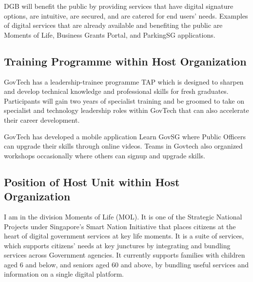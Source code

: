 \noindent
DGB will benefit the public by providing services that have digital signature options, are intuitive, are secured, and are catered for end users' needs. Examples of digital services that are already available and benefiting the public are Moments of Life, Business Grants Portal, and ParkingSG applications.\cite{REF3:1}

\subsection{Training Programme within Host Organization}
\noindent
GovTech has a leadership-trainee programme TAP which is designed to sharpen and develop technical knowledge and professional skills for fresh graduates. Participants will gain two years of specialist training and be groomed to take on specialist and technology leadership roles within GovTech that can also accelerate their career development.\cite{REF4:1}

\noindent
GovTech has developed a mobile application Learn GovSG where Public Officers can upgrade their skills through online videos. Teams in Govtech also organized workshops occasionally where others can signup and upgrade skills.\cite{REF5:1}

\subsection{Position of Host Unit within Host Organization}
\noindent
I am in the division Moments of Life (MOL). It is one of the Strategic National Projects under Singapore's Smart Nation Initiative that places citizens at the heart of digital government services at key life moments. It is a suite of services, which supports citizens' needs at key junctures by integrating and bundling services across Government agencies. It currently supports families with children aged 6 and below, and seniors aged 60 and above, by bundling useful services and information on a single digital platform.\cite{REF6:1}
